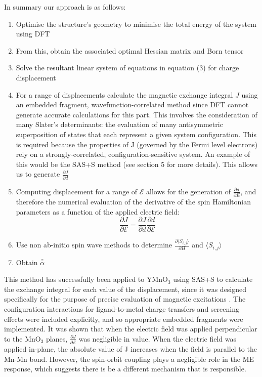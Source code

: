 \documentclass[10pt]{article}
\begin{document}
In summary our approach is as follows:

\begin{enumerate}
	\item Optimise the structure's geometry to minimise the total energy of the system using DFT
	\item From this, obtain the associated optimal Hessian matrix and Born tensor
	\item Solve the resultant linear system of equations in equation (3) for charge displacement
	\item For a range of displacements calculate the magnetic exchange integral $J$ using an embedded fragment, wavefunction-correlated method since DFT cannot generate accurate calculations for this part. This involves the consideration of many Slater's determinants: the evaluation of many antisymmetric superposition of states that each represent a given system configuration. This is required because the properties of J (governed by the Fermi level electrons) rely on a strongly-correlated, configuration-sensitive system. An example of this would be the SAS+S method (see section 5 for more details). This allows us to generate $\frac{\partial J}{\partial d}$
	\item Computing displacement for a range of $\mathcal{E}$ allows for the generation of $\frac{\partial d}{\partial E}$, and therefore the numerical evaluation of the derivative of the spin Hamiltonian parameters as a function of the applied electric field:
	\begin{equation*}
	\dfrac{\partial J}{\partial \mathcal{E}} = \dfrac{\partial J}{\partial d}\dfrac{\partial d}{\partial \mathcal{E}}
	\end{equation*}
	\item Use non ab-initio spin wave methods to determine $\frac{\partial\langle S_{i,j}\rangle}{\partial H}$ and $\langle S_{i,j}\rangle$
	\item Obtain $\bar{\bar{\alpha}}$
\end{enumerate}

This method has successfully been applied to YMnO$_3$ using SAS+S to calculate the exchange integral for each value of the displacement, since it was designed specifically for the purpose of precise evaluation of magnetic excitations \cite{varignon2013ab}. The configuration interactions for ligand-to-metal charge transfers and screening effects were included explicitly, and so appropriate embedded fragments were implemented. It was shown that when the electric field was applied perpendicular to the MnO$_3$ planes, $\frac{\partial J}{\partial \mathcal{E}}$  was negligible in value. When the electric field was applied in-plane, the absolute value of J increases when the field is parallel to the Mn-Mn bond. However, the spin-orbit coupling plays a negligible role in the ME response, which suggests there is be a different mechanism that is responsible.
\end{document}
